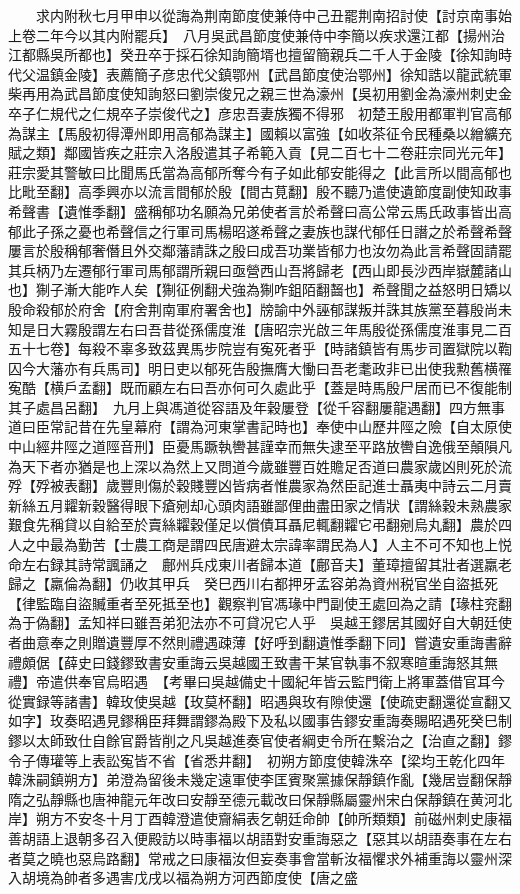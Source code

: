 　　求内附秋七月甲申以從誨為荆南節度使兼侍中己丑罷荆南招討使【討京南事始上卷二年今以其内附罷兵】　八月吳武昌節度使兼侍中李簡以疾求還江都【揚州治江都縣吳所都也】癸丑卒于採石徐知詢簡壻也擅留簡親兵二千人于金陵【徐知詢時代父温鎮金陵】表薦簡子彦忠代父鎮鄂州【武昌節度使治鄂州】徐知誥以龍武統軍柴再用為武昌節度使知詢怒曰劉崇俊兄之親三世為濠州【吳初用劉金為濠州刺史金卒子仁規代之仁規卒子崇俊代之】彦忠吾妻族獨不得邪　初楚王殷用都軍判官高郁為謀主【馬殷初得潭州即用高郁為謀主】國賴以富強【如收茶征令民種桑以繒纊充賦之類】鄰國皆疾之莊宗入洛殷遣其子希範入貢【見二百七十二卷莊宗同光元年】莊宗愛其警敏曰比聞馬氏當為高郁所奪今有子如此郁安能得之【此言所以間高郁也比毗至翻】高季興亦以流言間郁於殷【間古莧翻】殷不聽乃遣使遺節度副使知政事希聲書【遺惟季翻】盛稱郁功名願為兄弟使者言於希聲曰高公常云馬氏政事皆出高郁此子孫之憂也希聲信之行軍司馬楊昭遂希聲之妻族也謀代郁任日譖之於希聲希聲屢言於殷稱郁奢僭且外交鄰藩請誅之殷曰成吾功業皆郁力也汝勿為此言希聲固請罷其兵柄乃左遷郁行軍司馬郁謂所親曰亟營西山吾將歸老【西山即長沙西岸嶽麓諸山也】猘子漸大能咋人矣【猘征例翻犬強為猘咋鉏陌翻齧也】希聲聞之益怒明日矯以殷命殺郁於府舍【府舍荆南軍府署舍也】牓諭中外誣郁謀叛并誅其族黨至暮殷尚未知是日大霧殷謂左右曰吾昔從孫儒度淮【唐昭宗光啟三年馬殷從孫儒度淮事見二百五十七卷】每殺不辜多致茲異馬步院豈有寃死者乎【時諸鎮皆有馬步司置獄院以鞫囚今大藩亦有兵馬司】明日吏以郁死告殷撫膺大慟曰吾老耄政非已出使我勲舊横罹寃酷【横戶孟翻】既而顧左右曰吾亦何可久處此乎【蓋是時馬殷尸居而已不復能制其子處昌呂翻】　九月上與馮道從容語及年穀屢登【從千容翻屢龍遇翻】四方無事道曰臣常記昔在先皇幕府【謂為河東掌書記時也】奉使中山歷井陘之險【自太原使中山經井陘之道陘音刑】臣憂馬蹶執轡甚謹幸而無失逮至平路放轡自逸俄至顛隕凡為天下者亦猶是也上深以為然上又問道今歲雖豐百姓贍足否道曰農家歲凶則死於流殍【殍被表翻】歲豐則傷於穀賤豐凶皆病者惟農家為然臣記進士聶夷中詩云二月賣新絲五月糶新穀醫得眼下瘡剜却心頭肉語雖鄙俚曲盡田家之情狀【謂絲穀未熟農家艱食先稱貸以自給至於賣絲糶穀僅足以償債耳聶尼輒翻糶它弔翻剜烏丸翻】農於四人之中最為勤苦【士農工商是謂四民唐避太宗諱率謂民為人】人主不可不知也上悦命左右録其詩常諷誦之　鄜州兵戍東川者歸本道【鄜音夫】董璋擅留其壯者選羸老歸之【羸倫為翻】仍收其甲兵　癸巳西川右都押牙孟容弟為資州税官坐自盜抵死【律監臨自盜贓重者至死抵至也】觀察判官馮瑑中門副使王處回為之請【瑑柱兖翻為于偽翻】孟知祥曰雖吾弟犯法亦不可貸况它人乎　吳越王鏐居其國好自大朝廷使者曲意奉之則贈遺豐厚不然則禮遇疎薄【好呼到翻遺惟季翻下同】嘗遺安重誨書辭禮頗倨【薛史曰錢鏐致書安重誨云吳越國王致書干某官執事不叙寒暄重誨怒其無禮】帝遣供奉官烏昭遇　【考畢曰吳越備史十國紀年皆云監門衛上將軍蓋借官耳今從實録等諸書】韓玫使吳越【玫莫杯翻】昭遇與玫有隙使還【使疏吏翻還從宣翻又如字】玫奏昭遇見鏐稱臣拜舞謂鏐為殿下及私以國事告鏐安重誨奏賜昭遇死癸巳制鏐以太師致仕自餘官爵皆削之凡吳越進奏官使者綱吏令所在繫治之【治直之翻】鏐令子傳瓘等上表訟寃皆不省【省悉井翻】　初朔方節度使韓洙卒【梁均王乾化四年韓洙嗣鎮朔方】弟澄為留後未幾定遠軍使李匡賓聚黨據保靜鎮作亂【幾居豈翻保靜隋之弘靜縣也唐神龍元年改曰安靜至德元載改曰保靜縣屬靈州宋白保靜鎮在黄河北岸】朔方不安冬十月丁酉韓澄遣使齎絹表乞朝廷命帥【帥所類類】前磁州刺史康福善胡語上退朝多召入便殿訪以時事福以胡語對安重誨惡之【惡其以胡語奏事在左右者莫之曉也惡烏路翻】常戒之曰康福汝但妄奏事會當斬汝福懼求外補重誨以靈州深入胡境為帥者多遇害戊戌以福為朔方河西節度使【唐之盛